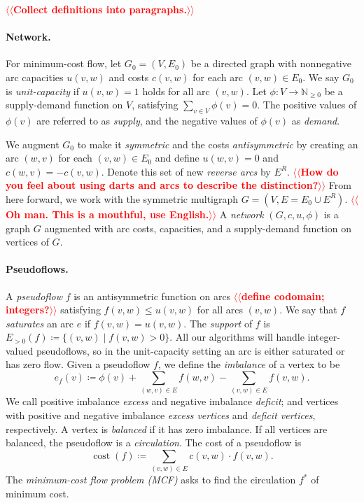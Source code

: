 \documentclass[11pt]{article}
\makeatletter
\def\ints{\mathbb{N}}
\def\fsupply{\phi}
\theoremstyle{plain}
\numberwithin{figure}{section}
\def\cost{\operatorname{cost}}
\def\n@te#1{\textsf{\boldmath \textbf{$\langle\!\langle$#1$\rangle\!\rangle$}}\leavevmode}
\def\note#1{\textcolor{red}{\n@te{#1}}}
\makeatother
\begin{document}
\note{Collect definitions into paragraphs.}

\paragraph{Network.}
For minimum-cost flow, let $G_0 = (V, E_0)$ be a directed graph with
nonnegative arc capacities $u(v, w)$ and costs $c(v, w)$ for each arc
$(v, w) \in E_0$.
We say $G_0$ is \emph{unit-capacity} if $u(v, w) = 1$ holds for all arc $(v, w)$.
Let $\fsupply: V \to \ints_{\geq 0}$ be a supply-demand function on $V$, satisfying $\sum_{v \in V} \fsupply(v) = 0$.
The positive values of $\fsupply(v)$ are referred to as \emph{supply}, and the negative values of $\fsupply(v)$ as \emph{demand}.

We augment $G_0$ to make it \emph{symmetric}
and the costs
\emph{antisymmetric}
by creating an arc $(w, v)$ for each $(v, w) \in E_0$ and define $u(w, v) = 0$ and $c(w, v) = -c(v, w)$.
Denote this set of new \emph{reverse arcs} by $E^R$.
\note{How do you feel about using darts and arcs to describe the distinction?}
From here forward, we work with the symmetric multigraph
$G = (V, E = E_0 \cup E^R)$. \note{Oh man.  This is a mouthful, use English.}
A \emph{network} $(G, c, u, \fsupply)$ is a graph $G$ augmented with arc costs, capacities, and a supply-demand function on vertices of $G$.

\paragraph{Pseudoflows.}
A \emph{pseudoflow} $f$ is an antisymmetric function on arcs \note{define codomain; integers?}
satisfying $f(v, w) \leq u(v, w)$ for all arcs $(v, w)$.
We say that $f$ \emph{saturates} an arc $e$ if $f(v, w) = u(v, w)$.
The \emph{support} of $f$ is $E_{>0}(f) \coloneqq \{(v, w) \mid f(v, w) > 0\}$.
All our algorithms will handle integer-valued pseudoflows, so in the
unit-capacity setting an arc is either saturated or has zero flow.
Given a pseudoflow $f$, we define the \emph{imbalance} of a vertex to be
\[
e_f(v) \coloneqq \fsupply(v) + \sum_{(w, v) \in E}{f(w, v)} - \sum_{(v, w) \in E}{f(v, w)}.
\]
We call positive imbalance \emph{excess} and negative imbalance \emph{deficit}; and
vertices with positive and negative imbalance \emph{excess vertices} and \emph{deficit vertices}, respectively.
A vertex is \emph{balanced} if it has zero imbalance.
If all vertices are balanced, the pseudoflow is a \emph{circulation}.
The cost of a pseudoflow is
\[
\cost(f) \coloneqq \sum_{(v, w) \in E} c(v, w) \cdot f(v, w).
\]
The \emph{minimum-cost flow problem (MCF)} asks to find the circulation $f^*$ of
minimum cost.
\end{document}
